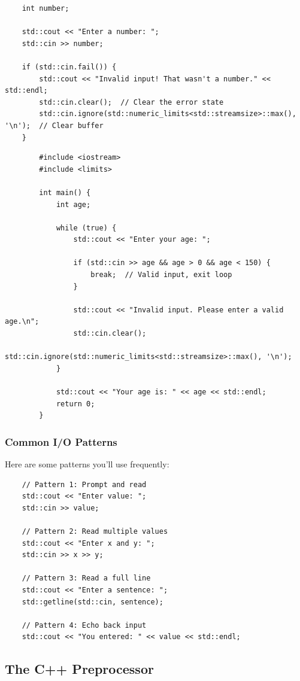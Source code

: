 \begin{lstlisting}
	int number;
	
	std::cout << "Enter a number: ";
	std::cin >> number;
	
	if (std::cin.fail()) {
		std::cout << "Invalid input! That wasn't a number." << std::endl;
		std::cin.clear();  // Clear the error state
		std::cin.ignore(std::numeric_limits<std::streamsize>::max(), '\n');  // Clear buffer
	}
\end{lstlisting}

\begin{example}{\leavevmode}
	
	\begin{lstlisting}
		#include <iostream>
		#include <limits>
		
		int main() {
			int age;
			
			while (true) {
				std::cout << "Enter your age: ";
				
				if (std::cin >> age && age > 0 && age < 150) {
					break;  // Valid input, exit loop
				}
				
				std::cout << "Invalid input. Please enter a valid age.\n";
				std::cin.clear();
				std::cin.ignore(std::numeric_limits<std::streamsize>::max(), '\n');
			}
			
			std::cout << "Your age is: " << age << std::endl;
			return 0;
		}
	\end{lstlisting}
\end{example}

\subsubsection{Common I/O Patterns}

Here are some patterns you'll use frequently:

\begin{lstlisting}
	// Pattern 1: Prompt and read
	std::cout << "Enter value: ";
	std::cin >> value;
	
	// Pattern 2: Read multiple values
	std::cout << "Enter x and y: ";
	std::cin >> x >> y;
	
	// Pattern 3: Read a full line
	std::cout << "Enter a sentence: ";
	std::getline(std::cin, sentence);
	
	// Pattern 4: Echo back input
	std::cout << "You entered: " << value << std::endl;
\end{lstlisting}

\subsection{The C++ Preprocessor}

